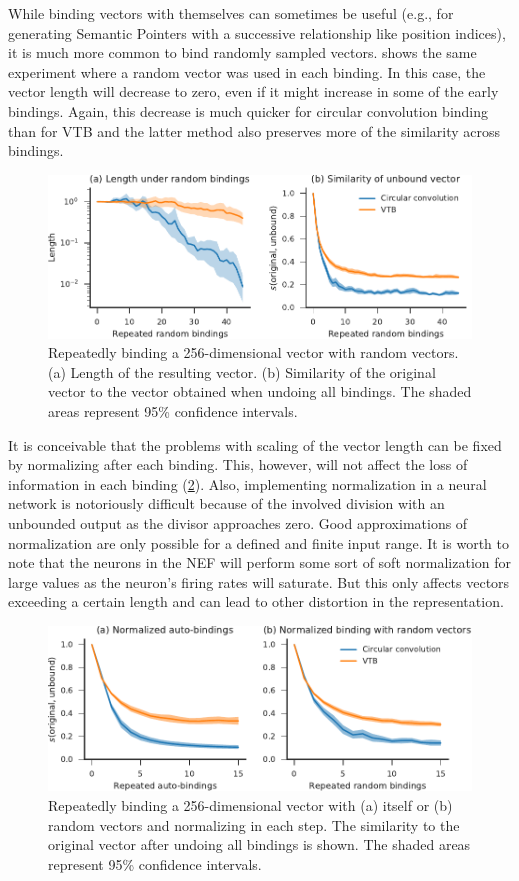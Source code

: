 While binding vectors with themselves can sometimes be useful (e.g., for generating Semantic Pointers with a successive relationship like position indices), it is much more common to bind randomly sampled vectors.
 shows the same experiment where a random vector was used in each binding.
In this case, the vector length will decrease to zero, even if it might increase in some of the early bindings.
Again, this decrease is much quicker for circular convolution binding than for VTB and the latter method also preserves more of the similarity across bindings.
\begin{figure}
    \centering
    \includegraphics{figures/bindings-random}
    \caption{Repeatedly binding a 256-dimensional vector with random vectors. (a) Length of the resulting vector. (b) Similarity of the original vector to the vector obtained when undoing all bindings. The shaded areas represent 95\% confidence intervals.}\label{fig:bindings-random}
\end{figure}

It is conceivable that the problems with scaling of the vector length can be fixed by normalizing after each binding.
This, however, will not affect the loss of information in each binding (\cref{fig:bindings-normalized}).
Also, implementing normalization in a neural network is notoriously difficult because of the involved division with an unbounded output as the divisor approaches zero.
Good approximations of normalization are only possible for a defined and finite input range.
It is worth to note that the neurons in the NEF will perform some sort of soft normalization for large values as the neuron's firing rates will saturate.
But this only affects vectors exceeding a certain length and can lead to other distortion in the representation.
\begin{figure}
    \centering
    \includegraphics{figures/bindings-normalized}
    \caption{Repeatedly binding a 256-dimensional vector with (a) itself or (b) random vectors and normalizing in each step. The similarity to the original vector after undoing all bindings is shown. The shaded areas represent 95\% confidence intervals.}\label{fig:bindings-normalized}
\end{figure}

